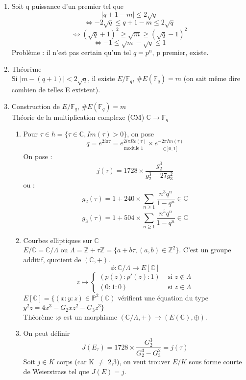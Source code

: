 \documentclass[12pt,a4paper]{report}
\begin{document}
\begin{enumerate}
\item Soit q puissance d'un premier tel que $$ |q+1-m| \leqslant 2\sqrt{q}$$
$$ \Leftrightarrow -2\sqrt{q} \leqslant q+1-m \leqslant 2\sqrt{q} $$
$$\Leftrightarrow (\sqrt{q}+1)^2 \geqslant \sqrt{m} \geqslant (\sqrt{q}-1)^2$$
$$ \Leftrightarrow -1 \leqslant \sqrt{m}-\sqrt{q} \leqslant 1$$
Problème : il n'est pas certain qu'un tel $q=p^n$, p premier, existe.
\item Théorème \\
Si $|m-(q+1)| < 2\sqrt{q}$, il existe $E / \mathbb{F}_q$, $\#E(\mathbb{F}_q) = m $ (on sait même dire combien de telles E existent).
\item Construction de $E / \mathbb{F}_q$,  $\#E(\mathbb{F}_q) = m $\\
Théorie de la multiplication complexe (CM) $ \mathbb{C} \longrightarrow \mathbb{F}_q $
\begin{enumerate}
\item Pour $ \tau \in h=\{\tau \in \mathbb{C}, Im(\tau) > 0 \}$, on pose $$ q=e^{2i\pi \tau} = \underset{\mbox{module 1}}{e^{2i\pi Re(\tau)}}\times \underset{\in ]0,1[}{e^{-2\pi Im(\tau)}}$$
On pose : 
$$ j(\tau)=1728\times \frac{g_2^3}{g_2^3-27g_3^2} $$
ou : $$ g_2(\tau)=1+240\times \sum_{n\geqslant 1} \frac{n^3q^n}{1-q^n} \in \mathbb{C} $$
$$ g_3(\tau)=1+504 \times \sum_{n\geqslant 1}\frac{n^5q^n}{1-q^n} \in \mathbb{C} $$
\item Courbes elliptiques sur $\mathbb{C}$\\
$E/\mathbb{C} = \mathbb{C} / \Lambda$ ou $\Lambda = \mathbb{Z} + \tau \mathbb{Z} = \{a+b\tau,(a,b)\in \mathbb{Z}^2\}$. C'est un groupe additif, quotient de $(\mathbb{C},+)$.
$$\phi : \mathbb{C}/\Lambda \longrightarrow E[\mathbb{C}]$$
$$ z \longmapsto \left\{\begin{array}{ll}
(p(z):p'(z):1) & \mbox{ si }z  \not\in \Lambda \\
(0:1:0) & \mbox{ si } z \in \Lambda \end{array}\right.$$
$E[\mathbb{C}] = \{(x:y:z) \in \mathbb{P}^2(\mathbb{C})$ vérifient une équation du type $ y^2z=4x^3-G_2xz^2-G_3z^3\}$\\
Théorème :$\phi$ est un morphisme $ (\mathbb{C}/\Lambda, + ) \rightarrow (E(\mathbb{C}),\oplus)$.
\item On peut définir 
$$ J(E_{\tau})=1728\times \frac{G_2^3}{G_2^3-G_3^2}=j(\tau) $$
Soit $j \in K$ corps (car K $\neq $ 2,3), on veut trouver $E/K$ sous forme courte de Weierstrass tel que $J(E)=j$.
\begin{itemize}

\end{itemize}
\end{enumerate}
\end{enumerate}
\end{document}
